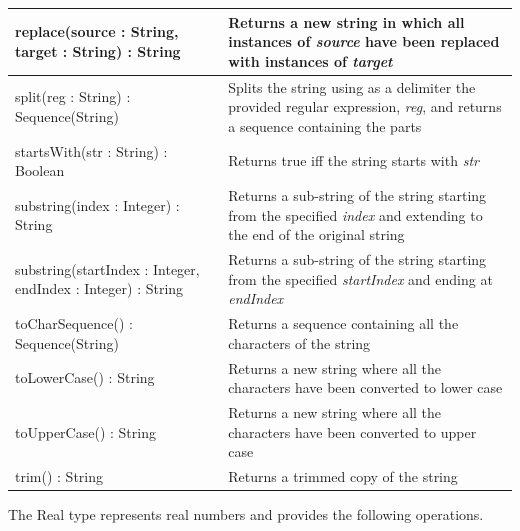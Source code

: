\begin{longtabu} {|p{6.5cm}|X|}
    replace(source : String, target : String) : String & Returns a new string in which all instances of \emph{source} have been replaced with instances of \emph{target}\\\hline
    
    split(reg : String) : Sequence(String) & Splits the string using as a delimiter the provided regular expression, \emph{reg}, and returns a sequence containing the parts\\\hline
    
    startsWith(str : String) : Boolean & Returns true iff the string starts with \emph{str}\\\hline
    
    substring(index : Integer) : String & Returns a sub-string of the string starting from the specified \emph{index} and extending to the end of the original string\\\hline
    
    substring(startIndex : Integer, endIndex : Integer) : String & Returns a sub-string of the string starting from the specified \emph{startIndex} and ending at \emph{endIndex} \\\hline
    
    toCharSequence() : Sequence(String) & Returns a sequence containing all the characters of the string\\\hline
    
    toLowerCase() : String & Returns a new string where all the characters have been converted to lower case\\\hline
    
    toUpperCase() : String & Returns a new string where all the characters have been converted to upper case\\\hline
    
    trim() : String & Returns a trimmed copy of the string \\\hline
\end{longtabu}

The Real type represents real numbers and provides the following operations.

